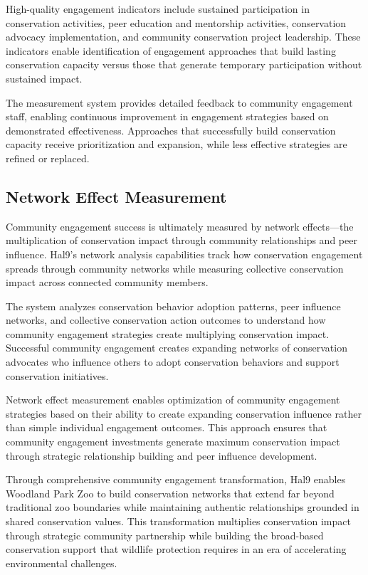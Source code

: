 \documentclass[
  Letterpaper,
]{scrbook}
\begin{document}
High-quality engagement indicators include sustained participation in
conservation activities, peer education and mentorship activities,
conservation advocacy implementation, and community conservation project
leadership. These indicators enable identification of engagement
approaches that build lasting conservation capacity versus those that
generate temporary participation without sustained impact.

The measurement system provides detailed feedback to community
engagement staff, enabling continuous improvement in engagement
strategies based on demonstrated effectiveness. Approaches that
successfully build conservation capacity receive prioritization and
expansion, while less effective strategies are refined or replaced.

\subsection{Network Effect
Measurement}\label{network-effect-measurement}

Community engagement success is ultimately measured by network
effects---the multiplication of conservation impact through community
relationships and peer influence. Hal9's network analysis capabilities
track how conservation engagement spreads through community networks
while measuring collective conservation impact across connected
community members.

The system analyzes conservation behavior adoption patterns, peer
influence networks, and collective conservation action outcomes to
understand how community engagement strategies create multiplying
conservation impact. Successful community engagement creates expanding
networks of conservation advocates who influence others to adopt
conservation behaviors and support conservation initiatives.

Network effect measurement enables optimization of community engagement
strategies based on their ability to create expanding conservation
influence rather than simple individual engagement outcomes. This
approach ensures that community engagement investments generate maximum
conservation impact through strategic relationship building and peer
influence development.

Through comprehensive community engagement transformation, Hal9 enables
Woodland Park Zoo to build conservation networks that extend far beyond
traditional zoo boundaries while maintaining authentic relationships
grounded in shared conservation values. This transformation multiplies
conservation impact through strategic community partnership while
building the broad-based conservation support that wildlife protection
requires in an era of accelerating environmental challenges.
\end{document}
